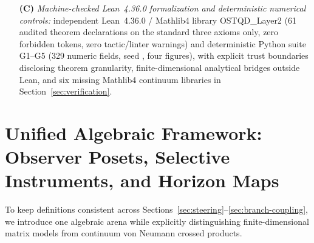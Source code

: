 \documentclass[11pt,a4paper]{article}
\theoremstyle{definition}
\theoremstyle{remark}
\newcommand{\1}{\mathbf{1}}
\newcommand{\code}[1]{{\scriptsize\ttfamily #1}}
\begin{document}
\begin{enumerate}
\begin{itemize}
    (iii)~\emph{Uniformly sharp polar-isometric $\ell^1$ pullback defect bounds and saturation audits (Theorem~\ref{thm:nonisometric}(b)):} embedding the positive-operator angle inequality of Kantorovich \cite{Kantorovich1948} and Gustafson \cite{Gustafson1968} (\S3 Lemma~3.3, \S7; normalized pure-state constant $2\varepsilon/(1+\sqrt{1-\varepsilon^2})$) alongside the sharp unnormalized bound $\sqrt{1+\varepsilon}-\sqrt{1-\varepsilon}$, mixed-state purification contraction, Helstrom-POVM saturation witnesses, and the postselection-normalization vs.\ Gisin reweighting connection.
    \item[\textbf{(C)}] \emph{Machine-checked Lean~4.36.0 formalization and deterministic numerical controls:} independent Lean~4.36.0 / Mathlib4 library \code{OSTQD\_Layer2} (61 audited theorem declarations on the standard three axioms only, zero forbidden tokens, zero tactic/linter warnings) and deterministic Python suite G1--G5 (329 numeric fields, seed \code{20261128}, four figures), with explicit trust boundaries disclosing theorem granularity, finite-dimensional analytical bridges outside Lean, and six missing Mathlib4 continuum libraries in Section~\ref{sec:verification}.
  \end{itemize}
\end{enumerate}

\section{Unified Algebraic Framework: Observer Posets, Selective Instruments, and Horizon Maps}\label{sec:framework}

To keep definitions consistent across Sections~\ref{sec:steering}--\ref{sec:branch-coupling}, we introduce one algebraic arena while explicitly distinguishing finite-dimensional matrix models from continuum von Neumann crossed products.
\end{document}

